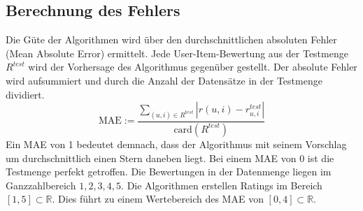 \subsection{Berechnung des Fehlers}\label{s.error}
Die Güte der Algorithmen wird über den durchschnittlichen absoluten Fehler (Mean Absolute Error) ermittelt. Jede User-Item-Bewertung aus der Testmenge $R^{test}$ wird der Vorhersage des Algorithmus gegenüber gestellt. Der absolute Fehler wird aufsummiert und durch die Anzahl der Datensätze in der Testmenge dividiert.
\begin{equation}
		\mathrm{MAE} := \dfrac{\sum\limits_{(u,i)\in R^{test}}|r(u,i)-r^{test}_{u,i}|}{\mathrm{card}(R^{test})}  	\label{MAE}
\end{equation}
Ein MAE von 1 bedeutet demnach, dass der Algorithmus mit seinem Vorschlag um durchschnittlich einen Stern daneben liegt. Bei einem MAE von 0 ist die Testmenge perfekt getroffen. Die Bewertungen in der Datenmenge liegen im Ganzzahlbereich ${1,2,3,4,5}$. Die Algorithmen erstellen Ratings im Bereich $[1,5]\subset \mathbb{R}$. Dies führt zu einem Wertebereich des MAE von $[0,4]\subset \mathbb{R}$.

\clearpage